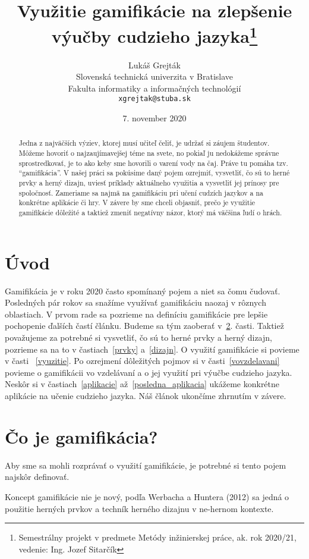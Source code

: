 \documentclass{article}
\title{Využitie gamifikácie na zlepšenie výučby cudzieho jazyka\thanks{Semestrálny projekt v predmete Metódy inžinierskej práce, ak. rok 2020/21, vedenie: Ing. Jozef Sitarčík}}
\author{Lukáš Grejták\\[2pt]
	{\small Slovenská technická univerzita v Bratislave}\\
	{\small Fakulta informatiky a informačných technológií}\\
	{\small \texttt{xgrejtak@stuba.sk}}
	}
\date{\small 7. november 2020}
\begin{document}
\maketitle
 
\begin{abstract}
Jedna z najväčších výziev, ktorej musí učiteľ čeliť, je udržať si záujem študentov. Môžeme hovoriť o najzaujímavejšej téme na svete, no pokiaľ ju nedokážeme správne sprostredkovať, je to ako keby sme hovorili o varení vody na čaj. Práve tu pomáha tzv. “gamifikácia”. V našej práci sa pokúsime daný pojem ozrejmiť, vysvetliť, čo sú to herné prvky a herný dizajn, uviesť príklady aktuálneho využitia a vysvetliť jej prínosy pre spoločnosť. Zameriame sa najmä na gamifikáciu pri učení cudzích jazykov a na konkrétne aplikácie či hry. V závere by sme chceli objasniť, prečo je využitie gamifikácie dôležité a taktiež zmeniť negatívny názor, ktorý má väčšina ľudí o hrách.
\end{abstract}

\section{Úvod}

Gamifikácia je v roku 2020 často spomínaný pojem a niet sa čomu čudovať. Posledných pár rokov sa snažíme využívať gamifikáciu naozaj v rôznych oblastiach. V prvom rade sa pozrieme na definíciu gamifikácie pre lepšie pochopenie ďalších častí článku. Budeme sa tým zaoberať v~\ref{cotoje}. časti. Taktiež považujeme za potrebné si vysvetliť, čo sú to herné prvky a herný dizajn, pozrieme sa na to v častiach~\ref{prvky} a~\ref{dizajn}. O využití gamifikácie si povieme v časti ~\ref{vyuzitie}. Po ozrejmení dôležitých pojmov si v časti~\ref{vovzdelavani} povieme o gamifikácii vo vzdelávaní a o jej využití pri výučbe cudzieho jazyka. Neskôr si v častiach~\ref{aplikacie} až~\ref{posledna_aplikacia} ukážeme konkrétne aplikácie na učenie cudzieho jazyka. Náš článok ukončíme zhrnutím v závere.  

\section{Čo je gamifikácia?} \label{cotoje}

Aby sme sa mohli rozprávať o využití gamifikácie, je potrebné si tento pojem najskôr definovať.

Koncept gamifikácie nie je nový, podľa Werbacha a Huntera (2012) sa jedná o použitie herných prvkov a techník herného dizajnu v ne-hernom kontexte\cite{werbach}. 
\end{document}
